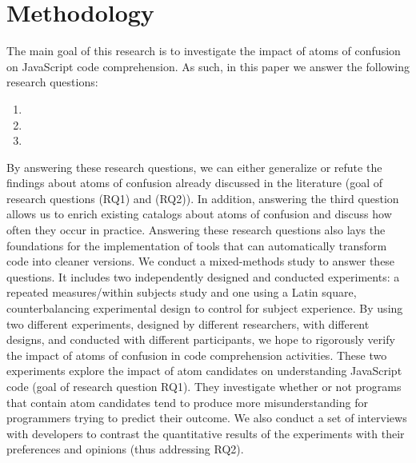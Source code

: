 \section{Methodology}
\label{method}

The main goal of this research is to investigate the impact of atoms of confusion on JavaScript code comprehension. As such, in this paper we answer the following research questions: 

\begin{enumerate}[(RQ1)]
\item \rqa 
\item \rqb
\item \rqd{}
\end{enumerate}

By answering these research questions, we can either generalize or refute the findings about atoms of confusion already discussed in the literature (goal of research questions (RQ1) and (RQ2)). 
In addition, answering the third question allows us to enrich existing catalogs about atoms of confusion and discuss how often they occur in practice. Answering these research questions also lays the foundations for the implementation of tools that can automatically transform code into cleaner versions.
We conduct a mixed-methods study to answer these questions. 
It includes two independently designed and conducted experiments: a repeated measures/within subjects study and one using a Latin square, counterbalancing experimental design to control for subject experience. By using two different experiments, designed by different researchers, with different designs, and conducted with different participants, we hope to rigorously verify the impact of atoms of confusion in code comprehension activities. These two experiments explore the impact of atom candidates on understanding JavaScript code (goal of research question RQ1). They investigate whether or not programs that contain atom candidates tend to produce more misunderstanding for programmers trying to predict their outcome.%
We also conduct a set of interviews with developers to contrast the quantitative results of the experiments with their preferences and opinions (thus addressing RQ2). 

